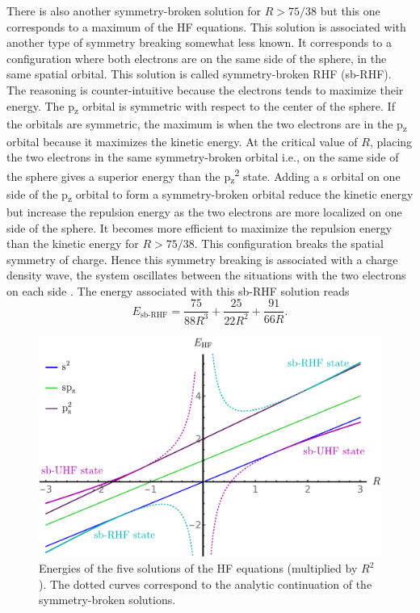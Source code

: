 \documentclass[11pt,a4paper]{article}
\begin{document}
There is also another symmetry-broken solution for $R>75/38$ but this one corresponds to a maximum of the HF equations. This solution is associated with another type of symmetry breaking somewhat less known. It corresponds to a configuration where both electrons are on the same side of the sphere, in the same spatial orbital. This solution is called symmetry-broken RHF (sb-RHF). The reasoning is counter-intuitive because the electrons tends to maximize their energy. The p\textsubscript{z} orbital is symmetric with respect to the center of the sphere. If the orbitals are symmetric, the maximum is when the two electrons are in the p\textsubscript{z} orbital because it maximizes the kinetic energy. At the critical value of $R$, placing the two electrons in the same symmetry-broken orbital i.e., on the same side of the sphere gives a superior energy than the p\textsubscript{z}\textsuperscript{2} state. Adding a s orbital on one side of the p\textsubscript{z} orbital to form a symmetry-broken orbital reduce the kinetic energy but increase the repulsion energy as the two electrons are more localized on one side of the sphere. It becomes more efficient to maximize the repulsion energy than the kinetic energy for $R>75/38$. This configuration breaks the spatial symmetry of charge. Hence this symmetry breaking is associated with a charge density wave, the system oscillates between the situations with the two electrons on each side \cite{GiulianiBook}.
The energy associated with this sb-RHF solution reads
\begin{equation}
E_{\text{sb-RHF}}=\frac{75}{88R^3}+\frac{25}{22R^2}+\frac{91}{66R}.
\end{equation}
\begin{figure}[h!]
    \centering
    \includegraphics[width=0.77\linewidth]{EsbHF.pdf}
    \caption{Energies of the five solutions of the HF equations (multiplied by $R^2$). The dotted curves correspond to the analytic continuation of the symmetry-broken solutions.}
    \label{fig:SpheriumNrj}
\end{figure}
\end{document}
